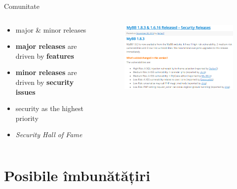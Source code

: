 \documentclass[9pt]{beamer}
\begin{document}
\begin{frame}{Comunitate}
  \begin{columns}
    \begin{column}[c]{0.50\textwidth}
        \begin{itemize}
		\vskip10pt
		\item major \& minor releases
		\vskip10pt
		\item \textbf{major releases} are driven by \textbf{features}
		\vskip10pt
		\item \textbf{minor releases }are driven by \textbf{security issues}
		\vskip10pt
		\item security as the highest priority
		\vskip10pt
		\item \textit{Security Hall of Fame}
	\end{itemize}
    \end{column}
    \begin{column}[c]{0.50\textwidth}
      \begin{figure}
        \includegraphics[scale=0.5]{figures/screen1}
      \end{figure}
    \end{column}
  \end{columns}
\end{frame}

\section[]{Posibile îmbunătățiri}
\end{document}
